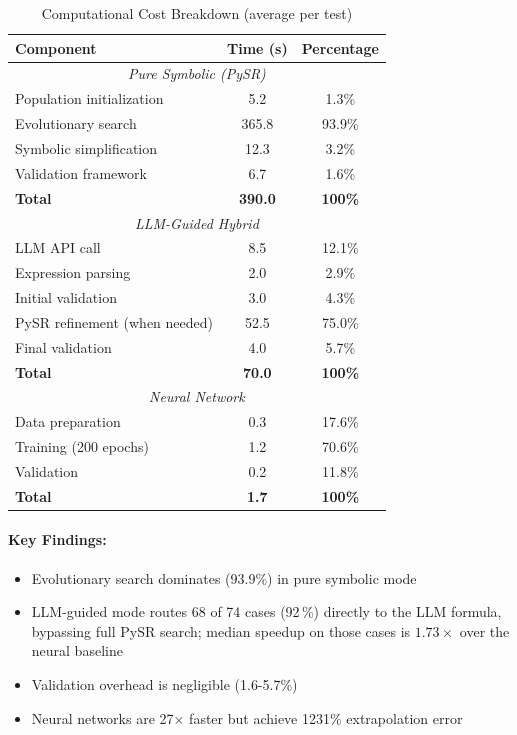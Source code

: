 \documentclass[twoside,11pt]{article}
\begin{document}
\begin{table}[H]
\centering
\caption{Computational Cost Breakdown (average per test)}
\label{tab:timing_breakdown}
\begin{tabular}{@{}lcc@{}}
\toprule
\textbf{Component} & \textbf{Time (s)} & \textbf{Percentage} \\
\midrule
\multicolumn{3}{c}{\textit{Pure Symbolic (PySR)}} \\
\midrule
Population initialization & 5.2 & 1.3\% \\
Evolutionary search & 365.8 & 93.9\% \\
Symbolic simplification & 12.3 & 3.2\% \\
Validation framework & 6.7 & 1.6\% \\
\midrule
\textbf{Total} & \textbf{390.0} & \textbf{100\%} \\
\midrule
\multicolumn{3}{c}{\textit{LLM-Guided Hybrid}} \\
\midrule
LLM API call & 8.5 & 12.1\% \\
Expression parsing & 2.0 & 2.9\% \\
Initial validation & 3.0 & 4.3\% \\
PySR refinement (when needed) & 52.5 & 75.0\% \\
Final validation & 4.0 & 5.7\% \\
\midrule
\textbf{Total} & \textbf{70.0} & \textbf{100\%} \\
\midrule
\multicolumn{3}{c}{\textit{Neural Network}} \\
\midrule
Data preparation & 0.3 & 17.6\% \\
Training (200 epochs) & 1.2 & 70.6\% \\
Validation & 0.2 & 11.8\% \\
\midrule
\textbf{Total} & \textbf{1.7} & \textbf{100\%} \\
\bottomrule
\end{tabular}
\end{table}

\paragraph{Key Findings:}
\begin{itemize}
\item Evolutionary search dominates (93.9\%) in pure symbolic mode
\item LLM-guided mode routes 68 of 74 cases (92\,\%) directly to the LLM formula, bypassing full PySR search; median speedup on those cases is $1.73\times$ over the neural baseline \citep{kambhampati2024llms}
\item Validation overhead is negligible (1.6-5.7\%)
\item Neural networks are 27$\times$ faster but achieve 1231\% extrapolation error
\end{itemize}
\end{document}
